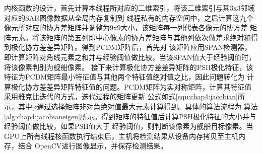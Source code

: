       内核函数的设计，首先计算本线程所对应的二维索引，将该二维索引与其3x3邻域对应的SAR图像数据从全局内存复制到
      线程私有的内存空间中，之后计算这九个像元所对应的协方差矩阵并调整为9x9大小，该矩阵每一列代表各像元的协方差
      矩阵元素。将该矩阵的第五列即中心像素的协方差矩阵与其他列依次做差求绝对和得到极化协方差差异矩阵。得到PCDM矩阵后，首先对
      该矩阵应用SPAN检测器，即计算矩阵对角线元素之和并与经验阈值做比较，当该SPAN值大于经验阈值时，将该像素判别为舰船像素。
      接下来计算极化协方差差异矩阵的PSH极化特征，该特征为PCDM矩阵最小特征值与其他两个特征值绝对值之比，因此问题转化为
      计算极化协方差差异矩阵特征值的问题。PCDM矩阵为实对称矩阵，计算其特征值采用雅克比迭代的方式，迭代过程的矩阵更新
      公式如式\ref{equ:chap4:jacobian}所示，其中$\varphi$通过选择矩阵非对角绝对值最大元素计算得到。具体的算法流程为
      算法\ref{alg:chap4:jacobianeigen}所示。得到矩阵的特征值后计算PSH极化特征的大小并与经验阈值做比较，如果PSH值大于
      经验阈值，则判断该像素为舰船目标像素。当GPU上所有线程核函数执行结束后，主机将检测结果从设备内存拷贝至主机内存，结合
      OpenCV进行图像显示，并保存检测结果。

